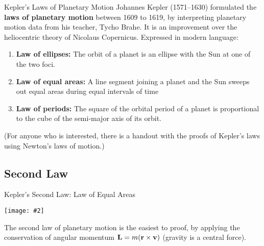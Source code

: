\documentclass[12pt,compress,aspectratio=169]{beamer}
\newcommand{\pic}[2]{\texttt{[image: \#2]}}
\newcommand{\mb}[1]{\ensuremath\mathbf{#1}}
\begin{document}
\begin{frame}{Kepler's Laws of Planetary Motion}
  Johannes Kepler (1571--1630) formulated the \textbf{laws of planetary motion}
  between 1609 to 1619, by interpreting planetary motion data from his teacher,
  Tycho Brahe. It is an improvement over the heliocentric theory of Nicolaus
  Copernicus. Expressed in modern language:
  \begin{enumerate}
  \item\textbf{Law of ellipses:} The orbit of a planet is an ellipse with the
    Sun at one of the two foci.
  \item\textbf{Law of equal areas:} A line segment joining a planet and the Sun
    sweeps out equal areas during equal intervals of time
  \item \textbf{Law of periods:} The square of the orbital period of a planet
    is proportional to the cube of the semi-major axis of its orbit.
  \end{enumerate}
  (For anyone who is interested, there is a handout with the proofs of Kepler's
  laws using Newton's laws of motion.)
\end{frame}



\subsection{Second Law}

\begin{frame}{Kepler's Second Law: Law of Equal Areas}
  \begin{center}

    \pic{.4}{201532-132212364-3243-planet.png}
  \end{center}
  The second law of planetary motion is the easiest to proof, by applying the
  conservation of angular momentum $\mb{L}=m(\mb{r}\times\mb{v})$ (gravity is a
  central force).
\end{frame}
\end{document}
